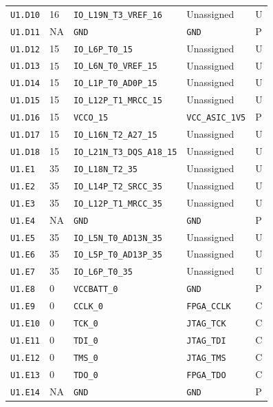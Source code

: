 \documentclass[11pt,a4paper]{article}
\begin{document}
\begin{longtable}{@{}P{20mm}P{10mm}P{75mm}P{49mm}P{7mm}@{}}
\nolinkurl{U1.D10} & 16 & \nolinkurl{IO_L19N_T3_VREF_16} & Unassigned & U \\
\nolinkurl{U1.D11} & NA & \nolinkurl{GND} & \nolinkurl{GND} & P \\
\nolinkurl{U1.D12} & 15 & \nolinkurl{IO_L6P_T0_15} & Unassigned & U \\
\nolinkurl{U1.D13} & 15 & \nolinkurl{IO_L6N_T0_VREF_15} & Unassigned & U \\
\nolinkurl{U1.D14} & 15 & \nolinkurl{IO_L1P_T0_AD0P_15} & Unassigned & U \\
\nolinkurl{U1.D15} & 15 & \nolinkurl{IO_L12P_T1_MRCC_15} & Unassigned & U \\
\nolinkurl{U1.D16} & 15 & \nolinkurl{VCCO_15} & \nolinkurl{VCC_ASIC_1V5} & P \\
\nolinkurl{U1.D17} & 15 & \nolinkurl{IO_L16N_T2_A27_15} & Unassigned & U \\
\nolinkurl{U1.D18} & 15 & \nolinkurl{IO_L21N_T3_DQS_A18_15} & Unassigned & U \\
\nolinkurl{U1.E1} & 35 & \nolinkurl{IO_L18N_T2_35} & Unassigned & U \\
\nolinkurl{U1.E2} & 35 & \nolinkurl{IO_L14P_T2_SRCC_35} & Unassigned & U \\
\nolinkurl{U1.E3} & 35 & \nolinkurl{IO_L12P_T1_MRCC_35} & Unassigned & U \\
\nolinkurl{U1.E4} & NA & \nolinkurl{GND} & \nolinkurl{GND} & P \\
\nolinkurl{U1.E5} & 35 & \nolinkurl{IO_L5N_T0_AD13N_35} & Unassigned & U \\
\nolinkurl{U1.E6} & 35 & \nolinkurl{IO_L5P_T0_AD13P_35} & Unassigned & U \\
\nolinkurl{U1.E7} & 35 & \nolinkurl{IO_L6P_T0_35} & Unassigned & U \\
\nolinkurl{U1.E8} & 0 & \nolinkurl{VCCBATT_0} & \nolinkurl{GND} & P \\
\nolinkurl{U1.E9} & 0 & \nolinkurl{CCLK_0} & \nolinkurl{FPGA_CCLK} & C \\
\nolinkurl{U1.E10} & 0 & \nolinkurl{TCK_0} & \nolinkurl{JTAG_TCK} & C \\
\nolinkurl{U1.E11} & 0 & \nolinkurl{TDI_0} & \nolinkurl{JTAG_TDI} & C \\
\nolinkurl{U1.E12} & 0 & \nolinkurl{TMS_0} & \nolinkurl{JTAG_TMS} & C \\
\nolinkurl{U1.E13} & 0 & \nolinkurl{TDO_0} & \nolinkurl{FPGA_TDO} & C \\
\nolinkurl{U1.E14} & NA & \nolinkurl{GND} & \nolinkurl{GND} & P \\

\end{longtable}
\end{document}
